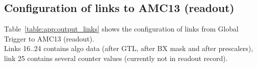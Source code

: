 \clearpage

\subsection{Configuration of links to AMC13 (readout)}\label{sec:app:app_c}



Table~\ref{table:app:output_links} shows the configuration of links from Global Trigger to AMC13 (readout).\\
Links 16..24 contains algo data (after GTL, after BX mask and after prescalers), link 25 contains several counter values (currently not in readout record).


